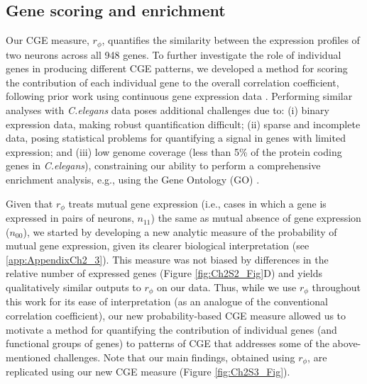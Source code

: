 \subsection*{Gene scoring and enrichment}
Our CGE measure, $r_\phi$, quantifies the similarity between the expression profiles of two neurons across all 948 genes.
To further investigate the role of individual genes in producing different CGE patterns, we developed a method for scoring the contribution of each individual gene to the overall correlation coefficient, following prior work using continuous gene expression data \citep{Fulcher2016}.
Performing similar analyses with \emph{C.elegans} data poses additional challenges due to:
(i) binary expression data, making robust quantification difficult;
(ii) sparse and incomplete data, posing statistical problems for quantifying a signal in genes with limited expression;
and (iii) low genome coverage (less than 5\% of the protein coding genes in \emph{C.elegans}), constraining our ability to perform a comprehensive enrichment analysis, e.g., using the Gene Ontology (GO) \citep{Ashburner2000}.

Given that $r_\phi$ treats mutual gene expression (i.e., cases in which a gene is expressed in pairs of neurons, $n_{11}$) the same as mutual absence of gene expression ($n_{00}$), we started by developing a new analytic measure of the probability of mutual gene expression, given its clearer biological interpretation (see \ref{app:AppendixCh2_3}).
This measure was not biased by differences in the relative number of expressed genes (Figure \ref{fig:Ch2S2_Fig}D) and yields qualitatively similar outputs to $r_\phi$ on our data.
Thus, while we use $r_\phi$ throughout this work for its ease of interpretation (as an analogue of the conventional correlation coefficient), our new probability-based CGE measure allowed us to motivate a method for quantifying the contribution of individual genes (and functional groups of genes) to patterns of CGE that addresses some of the above-mentioned challenges.
Note that our main findings, obtained using $r_\phi$, are replicated using our new CGE measure (Figure \ref{fig:Ch2S3_Fig}).

